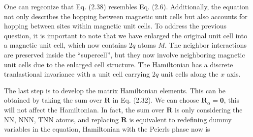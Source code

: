 \documentclass{report}
\begin{document}
One can regconize that Eq. (2.38) resembles Eq. (2.6). Additionally, the equation not only describes the hopping between magnetic unit cells but also accounts for hopping between sites within magnetic unit cells. To address the previous question, it is important to note that we have enlarged the original unit cell into a magnetic unit cell, which now contains $2q$ atoms $M$. The neighbor interactions are preserved inside the ``supercell'', but they now involve neighboring magnetic unit cells due to the enlarged cell structure. The Hamiltonian has a discrete tranlastional invariance with a unit cell carrying $2q$ unit cells along the $x$ axis.

The last step is to develop the matrix Hamiltonian elements. This can be obtained by taking the sum over $\mathbf{R}$ in Eq. (2.32).
We can choose $\mathbf{R}_{\alpha} = \mathbf{0}$, this will not affect the Hamiltonian. In fact, the sum over $\mathbf{R}$ is only considering the \ac{NN}, \ac{NNN}, \ac{TNN} atoms, and replacing $\mathbf{R}$ is equivalent to redefining dummy variables in the equation, Hamiltonian with the Peierls phase now is
\end{document}
